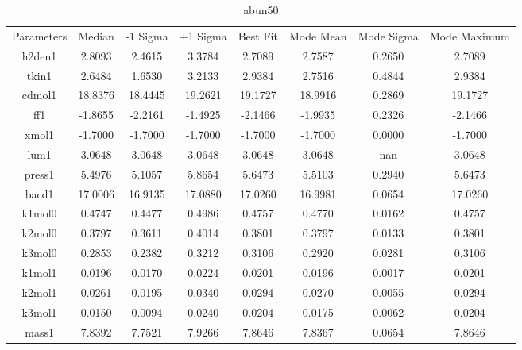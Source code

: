 \begin{table}
\caption{abun50}
\begin{tabular}{cccccccc}
Parameters & Median & -1 Sigma & +1 Sigma & Best Fit & Mode Mean & Mode Sigma & Mode Maximum \\
h2den1 & 2.8093 & 2.4615 & 3.3784 & 2.7089 & 2.7587 & 0.2650 & 2.7089 \\
tkin1 & 2.6484 & 1.6530 & 3.2133 & 2.9384 & 2.7516 & 0.4844 & 2.9384 \\
cdmol1 & 18.8376 & 18.4445 & 19.2621 & 19.1727 & 18.9916 & 0.2869 & 19.1727 \\
ff1 & -1.8655 & -2.2161 & -1.4925 & -2.1466 & -1.9935 & 0.2326 & -2.1466 \\
xmol1 & -1.7000 & -1.7000 & -1.7000 & -1.7000 & -1.7000 & 0.0000 & -1.7000 \\
lum1 & 3.0648 & 3.0648 & 3.0648 & 3.0648 & 3.0648 & nan & 3.0648 \\
press1 & 5.4976 & 5.1057 & 5.8654 & 5.6473 & 5.5103 & 0.2940 & 5.6473 \\
bacd1 & 17.0006 & 16.9135 & 17.0880 & 17.0260 & 16.9981 & 0.0654 & 17.0260 \\
k1mol0 & 0.4747 & 0.4477 & 0.4986 & 0.4757 & 0.4770 & 0.0162 & 0.4757 \\
k2mol0 & 0.3797 & 0.3611 & 0.4014 & 0.3801 & 0.3797 & 0.0133 & 0.3801 \\
k3mol0 & 0.2853 & 0.2382 & 0.3212 & 0.3106 & 0.2920 & 0.0281 & 0.3106 \\
k1mol1 & 0.0196 & 0.0170 & 0.0224 & 0.0201 & 0.0196 & 0.0017 & 0.0201 \\
k2mol1 & 0.0261 & 0.0195 & 0.0340 & 0.0294 & 0.0270 & 0.0055 & 0.0294 \\
k3mol1 & 0.0150 & 0.0094 & 0.0240 & 0.0204 & 0.0175 & 0.0062 & 0.0204 \\
mass1 & 7.8392 & 7.7521 & 7.9266 & 7.8646 & 7.8367 & 0.0654 & 7.8646 \\
\end{tabular}
\end{table}
